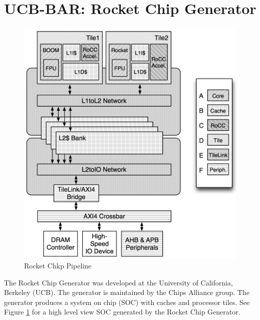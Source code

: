 \documentclass[../main.tex]{subfiles}
\begin{document}
\section{UCB-BAR: Rocket Chip Generator}
\begin{figure}
    \centering
    \includegraphics[scale=.5]{pngs/RocketChipGeneratorLayout.png}
    \caption{Rocket Chkp Pipeline\cite{Asanović:EECS-2016-17}}
    \label{fig:RocketCipGen}
\end{figure}
The Rocket Chip Generator was developed at the University of California, Berkeley (UCB). The generator is maintained by the Chips Alliance group. The generator produces a system on chip (SOC) with caches and processor tiles. See Figure \ref{fig:RocketCipGen} for a high level view SOC generated by the Rocket Chip Generator. %

\end{document}
